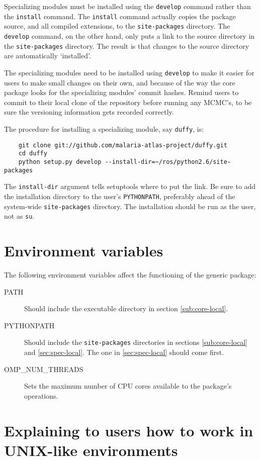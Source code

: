 \medskip
Specializing modules must be installed using the \texttt{develop} command rather than the \texttt{install} command. The \texttt{install} command actually copies the package source, and all compiled extensions, to the \texttt{site-packages} directory. The \texttt{develop} command, on the other hand, only puts a link to the source directory in the \texttt{site-packages} directory. The result is that changes to the source directory are automatically `installed'.

The specializing modules need to be installed using \texttt{develop} to make it easier for users to make small changes on their own, and because of the way the core package looks for the specializing modules' commit hashes. Remind users to commit to their local clone of the repository before running any MCMC's, to be sure the versioning information gets recorded correctly.

The procedure for installing a specializing module, say \texttt{duffy}, is:
\begin{verbatim}
    git clone git://github.com/malaria-atlas-project/duffy.git
    cd duffy
    python setup.py develop --install-dir=~/ros/python2.6/site-packages
\end{verbatim}
The \texttt{install-dir} argument tells setuptools where to put the link. Be sure to add the installation directory to the user's \texttt{PYTHONPATH}, preferably ahead of the system-wide \texttt{site-packages} directory. The installation should be run as the user, not as \texttt{su}.

\section{Environment variables}
The following environment variables affect the functioning of the generic package:
\begin{description}
    \item[PATH] Should include the executable directory in section \ref{sub:core-local}.
    \item[PYTHONPATH] Should include the \texttt{site-packages} directories in sections \ref{sub:core-local} and \ref{sec:spec-local}. The one in \ref{sec:spec-local} should come first.
    \item[OMP\_NUM\_THREADS] Sets the maximum number of CPU cores available to the package's operations. 
\end{description}

\section{Explaining to users how to work in UNIX-like environments}

